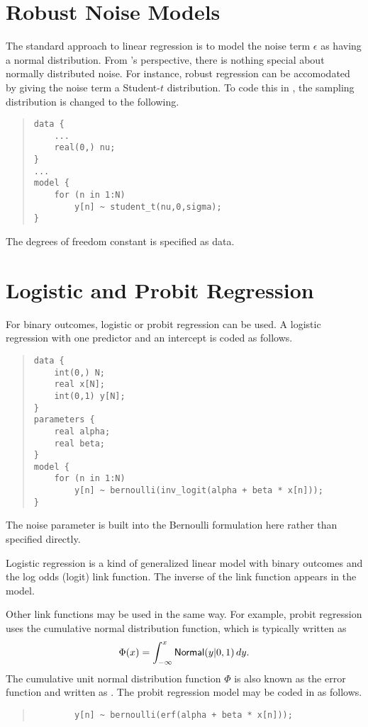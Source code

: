\section{Robust Noise Models}

The standard approach to linear regression is to model the noise
term $\epsilon$ as having a normal distribution.  From \Stan's
perspective, there is nothing special about normally distributed
noise.  For instance, robust regression can be accomodated by giving
the noise term a Student-$t$ distribution.  To code this in \Stan, the
sampling distribution is changed to the following.
%
\begin{quote}
\begin{Verbatim}
data {
    ...
    real(0,) nu;
}
...
model {
    for (n in 1:N)
        y[n] ~ student_t(nu,0,sigma);
}
\end{Verbatim}
\end{quote}
%
The degrees of freedom constant  is specified as data.

\section{Logistic and Probit Regression}

For binary outcomes, logistic or probit regression can be used.  A
logistic regression with one predictor and an intercept is coded as
follows. 
%
\begin{quote}
\begin{Verbatim}
data {
    int(0,) N;
    real x[N];
    int(0,1) y[N];
}
parameters {
    real alpha;
    real beta;
}
model {
    for (n in 1:N)
        y[n] ~ bernoulli(inv_logit(alpha + beta * x[n]));
} 
\end{Verbatim}
\end{quote}
%
The noise parameter is built into the Bernoulli formulation here
rather than specified directly.

Logistic regression is a kind of generalized linear model with binary
outcomes and the log odds (logit) link function.  The inverse of the
link function appears in the model.  

Other link functions may be used in the same way.  For example, probit
regression uses the cumulative normal distribution function, which is
typically written as 
\[
\Phi(x) = \int_{-\infty}^x \mbox{\sf Normal}(y|0,1) \, dy.
\]
%
The cumulative unit normal distribution function $\Phi$ is also known
as the error function and written as .  The probit
regression model may be coded in \Stan as follows.
%
\begin{quote}
\begin{Verbatim}
        y[n] ~ bernoulli(erf(alpha + beta * x[n]));
\end{Verbatim}
\end{quote}


